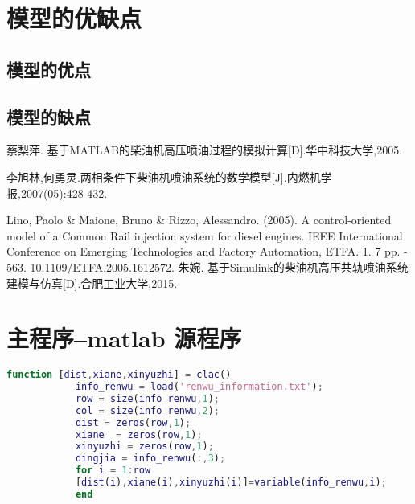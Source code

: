 \documentclass[withoutpreface,bwprint]{cumcmthesis} %
\begin{document}
			
			\section{模型的优缺点}
			\subsection{模型的优点}
			
			\subsection{模型的缺点}
			
			
			
			\begin{thebibliography}{9}%
				 蔡梨萍. 基于MATLAB的柴油机高压喷油过程的模拟计算[D].华中科技大学,2005.
				
				李旭林,何勇灵.两相条件下柴油机喷油系统的数学模型[J].内燃机学报,2007(05):428-432.
				
				Lino, Paolo \& Maione, Bruno \& Rizzo, Alessandro. (2005). A control-oriented model of a Common Rail injection system for diesel engines. IEEE International Conference on Emerging Technologies and Factory Automation, ETFA. 1. 7 pp. - 563. 10.1109/ETFA.2005.1612572. 
				朱婉. 基于Simulink的柴油机高压共轨喷油系统建模与仿真[D].合肥工业大学,2015.
				
				
			\end{thebibliography}
			
			\newpage
			\appendix
			\section{主程序--matlab 源程序}
			\begin{lstlisting}[language=matlab]
			function [dist,xiane,xinyuzhi] = clac()
			info_renwu = load('renwu_information.txt');
			row = size(info_renwu,1);
			col = size(info_renwu,2);
			dist = zeros(row,1);
			xiane  = zeros(row,1);
			xinyuzhi = zeros(row,1);
			dingjia = info_renwu(:,3);
			for i = 1:row
			[dist(i),xiane(i),xinyuzhi(i)]=variable(info_renwu,i); 
			end
			
			\end{lstlisting}
			
\end{document}
